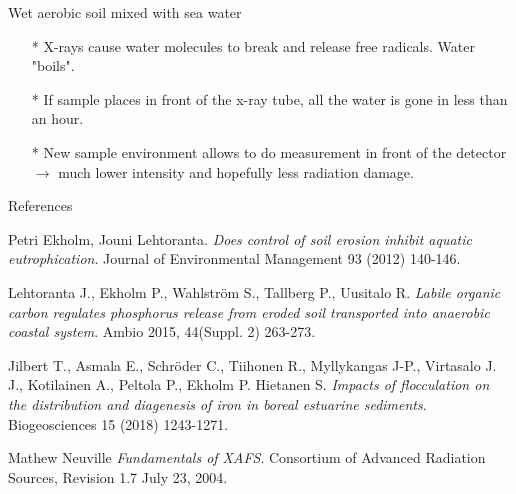 \documentclass{beamer}
\begin{document}
  \begin{frame}{Wet aerobic soil mixed with sea water}
  \begin{itemize}
    \item[*] X-rays cause water molecules to break and release free  radicals. Water "boils".
    \item[*] If sample places in front of the x-ray tube, all the water is gone in less than an hour. 
    \item[*] New sample environment allows to do measurement in front of the detector $\rightarrow$ much lower intensity and hopefully less radiation damage.
  \end{itemize}
  \end{frame}
  
  \begin{frame}{References}
  \begin{thebibliography}{9}
  \beamertemplatebookbibitems
  Petri Ekholm, Jouni Lehtoranta.
  \textit{Does control of soil erosion inhibit aquatic eutrophication}.
  Journal of Environmental Management 93 (2012) 140-146.

  \beamertemplatebookbibitems
  Lehtoranta J., Ekholm P., Wahlström S., Tallberg P., Uusitalo R.
  \textit{Labile organic carbon regulates phosphorus release from eroded soil transported into anaerobic coastal system}.
  Ambio 2015, 44(Suppl. 2) 263-273.

  \beamertemplatebookbibitems
  Jilbert T., Asmala E., Schröder C., Tiihonen R., Myllykangas J-P., Virtasalo J. J., Kotilainen A., Peltola P., Ekholm P.  Hietanen S.
  \textit{Impacts of flocculation on the distribution and diagenesis of iron in boreal estuarine sediments}.
Biogeosciences 15 (2018) 1243-1271. 

  \beamertemplatebookbibitems
  Mathew Neuville
  \textit{Fundamentals of XAFS}.
Consortium of Advanced Radiation Sources, Revision 1.7 July 23, 2004. 
  \end{thebibliography}
  \end{frame}
\end{document}
